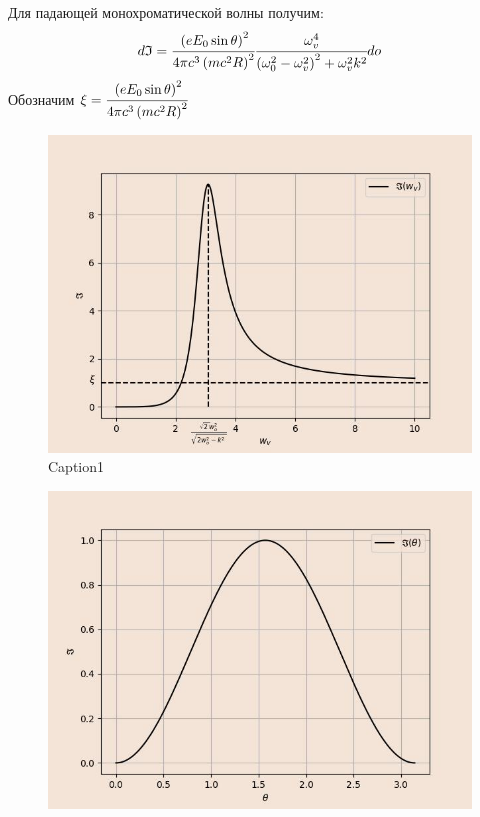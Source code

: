 Для падающей монохроматической волны получим:
\begin{equation}
    d\mathfrak{I} =  \cfrac{\left( eE_0 \sin \theta \right)^2}{4\pi c^3 \left( mc^2R \right)^2} 
    \cfrac{\omega_v^4}{\left( \omega_0^2 - \omega_v^2  \right)^2 + \omega_v^2 k^2 } do
\end{equation}
Обозначим $\xi = \cfrac{\left( eE_0 \sin \theta \right)^2}{4\pi c^3 \left( mc^2R \right)^2}$
\begin{figure}[H]
    \centering
    \includegraphics[width=1\textwidth]{sours_img/omega.jpg}
    \caption{Caption1}
    \label{pict:j_w}
\end{figure}


\begin{figure}[H]
    \centering
    \includegraphics[trim={0 0 0 0},clip,width=1\textwidth]{sours_img/phi.jpg}
    \label{pict:J_phi}
\end{figure}


